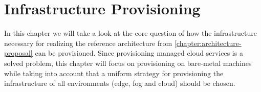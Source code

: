 \chapter{Infrastructure Provisioning}  
\label{chapter:infrastructure-provisioning}
    In this chapter we will take a look at the core question of how the infrastructure necessary for realizing the reference architecture from \autoref{chapter:architecture-proposal} can be provisioned. Since provisioning managed cloud services is a solved problem, this chapter will focus on provisioning on bare-metal machines while taking into account that a uniform strategy for provisioning the infrastructure of all environments (edge, fog and cloud) should be chosen.

    
    
    
        
        
        
